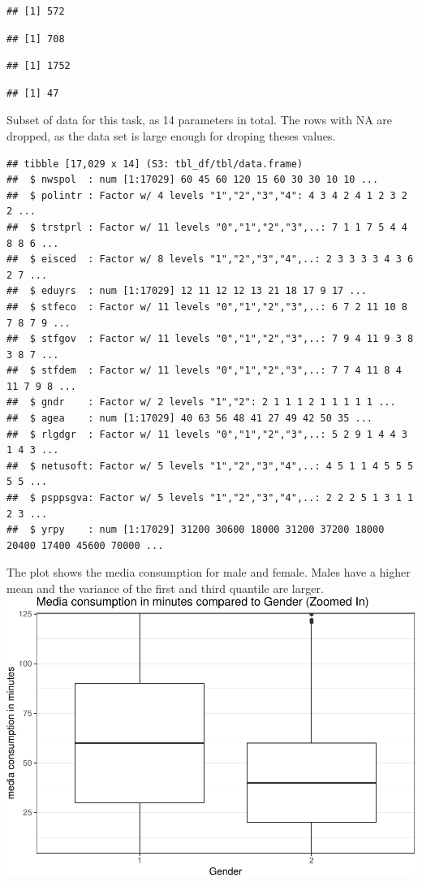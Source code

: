 \documentclass[
]{article}
\begin{document}
\begin{verbatim}
## [1] 572
\end{verbatim}

\begin{verbatim}
## [1] 708
\end{verbatim}

\begin{verbatim}
## [1] 1752
\end{verbatim}

\begin{verbatim}
## [1] 47
\end{verbatim}

Subset of data for this task, as 14 parameters in total. The rows with
NA are dropped, as the data set is large enough for droping theses
values.

\begin{verbatim}
## tibble [17,029 x 14] (S3: tbl_df/tbl/data.frame)
##  $ nwspol  : num [1:17029] 60 45 60 120 15 60 30 30 10 10 ...
##  $ polintr : Factor w/ 4 levels "1","2","3","4": 4 3 4 2 4 1 2 3 2 2 ...
##  $ trstprl : Factor w/ 11 levels "0","1","2","3",..: 7 1 1 7 5 4 4 8 8 6 ...
##  $ eisced  : Factor w/ 8 levels "1","2","3","4",..: 2 3 3 3 3 4 3 6 2 7 ...
##  $ eduyrs  : num [1:17029] 12 11 12 12 13 21 18 17 9 17 ...
##  $ stfeco  : Factor w/ 11 levels "0","1","2","3",..: 6 7 2 11 10 8 7 8 7 9 ...
##  $ stfgov  : Factor w/ 11 levels "0","1","2","3",..: 7 9 4 11 9 3 8 3 8 7 ...
##  $ stfdem  : Factor w/ 11 levels "0","1","2","3",..: 7 7 4 11 8 4 11 7 9 8 ...
##  $ gndr    : Factor w/ 2 levels "1","2": 2 1 1 1 2 1 1 1 1 1 ...
##  $ agea    : num [1:17029] 40 63 56 48 41 27 49 42 50 35 ...
##  $ rlgdgr  : Factor w/ 11 levels "0","1","2","3",..: 5 2 9 1 4 4 3 1 4 3 ...
##  $ netusoft: Factor w/ 5 levels "1","2","3","4",..: 4 5 1 1 4 5 5 5 5 5 ...
##  $ psppsgva: Factor w/ 5 levels "1","2","3","4",..: 2 2 2 5 1 3 1 1 2 3 ...
##  $ yrpy    : num [1:17029] 31200 30600 18000 31200 37200 18000 20400 17400 45600 70000 ...
\end{verbatim}

The plot shows the media consumption for male and female. Males have a
higher mean and the variance of the first and third quantile are larger.
\includegraphics{ESS_DE_files/figure-latex/plotting of media consumaption-1.pdf}
\end{document}
